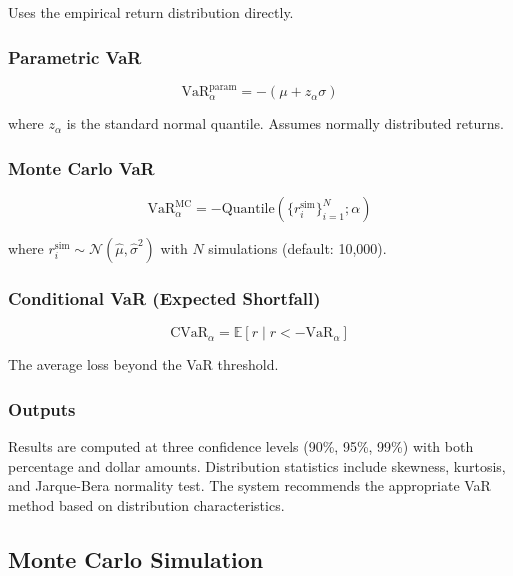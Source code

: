 Uses the empirical return distribution directly.

\subsubsection{Parametric VaR}

\begin{equation}
\text{VaR}_\alpha^{\text{param}} = -(\mu + z_\alpha \sigma)
\end{equation}

where $z_\alpha$ is the standard normal quantile.
Assumes normally distributed returns.

\subsubsection{Monte Carlo VaR}

\begin{equation}
\text{VaR}_\alpha^{\text{MC}} = -\text{Quantile}\left(\{r_i^{\text{sim}}\}_{i=1}^{N}; \alpha\right)
\end{equation}

where $r_i^{\text{sim}} \sim \mathcal{N}(\hat{\mu}, \hat{\sigma}^2)$ with $N$ simulations (default: 10,000).

\subsubsection{Conditional VaR (Expected Shortfall)}

\begin{equation}
\text{CVaR}_\alpha = \mathbb{E}\left[r \mid r < -\text{VaR}_\alpha\right]
\end{equation}

The average loss beyond the VaR threshold.

\subsubsection{Outputs}

Results are computed at three confidence levels (90\%, 95\%, 99\%) with both percentage and dollar amounts.
Distribution statistics include skewness, kurtosis, and Jarque-Bera normality test.
The system recommends the appropriate VaR method based on distribution characteristics.

\subsection{Monte Carlo Simulation}

